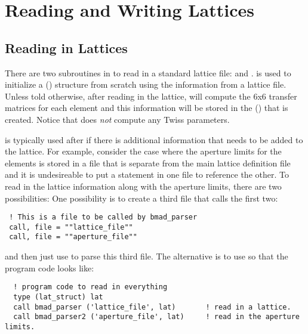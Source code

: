 \chapter{Reading and Writing Lattices}

\section{Reading in Lattices}
\label{s:lat.readin}

There are two subroutines in \bmad to read in a \bmad standard lattice file:
 and . 
is used to initialize a  () structure from scratch using the
information from a lattice file. Unless told otherwise, after reading in the lattice,
 will compute the 6x6 transfer matrices for each element and this information will
be stored in the  () that is created.  Notice that
 does {\em not} compute any Twiss parameters.

 is typically used after  if there is
additional information that needs to be added to the lattice. For example, consider the case where
the aperture limits for the elements is stored in a file that is separate from the main lattice
definition file and it is undesireable to put a  statement in one file to reference the
other.  To read in the lattice information along with the aperture limits, there are two
possibilities: One possibility is to create a third file that calls the first two:
\begin{verbatim}
 ! This is a file to be called by bmad_parser
 call, file = ""lattice_file""
 call, file = ""aperture_file""
\end{verbatim}
and then just use  to parse this third file. The
alternative is to use  so that the program code looks
like:
\begin{verbatim}
  ! program code to read in everything
  type (lat_struct) lat
  call bmad_parser ('lattice_file', lat)       ! read in a lattice.
  call bmad_parser2 ('aperture_file', lat)     ! read in the aperture limits.
\end{verbatim}

